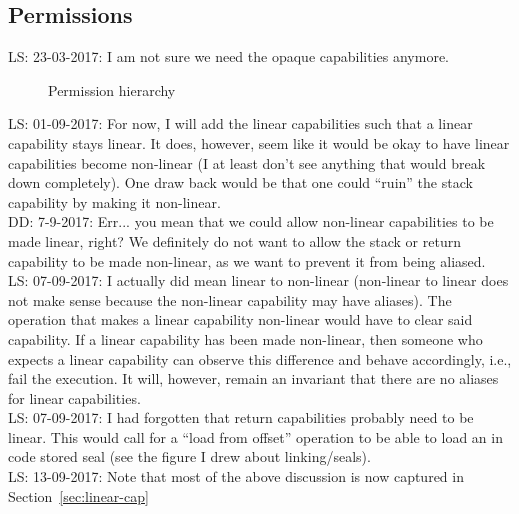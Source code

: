 \documentclass[a4paper]{article}
\newcommand\lau[1]{{\color{purple} \sf \footnotesize {LS: #1}}\\}
\newcommand\dominique[1]{{\color{purple} \sf \footnotesize {DD: #1}}\\}
\newcommand{\plainperm}[1]{\mathrm{#1}}
\newcommand{\rwx}{\plainperm{rwx}}
\newcommand{\rx}{\plainperm{rx}}
\newcommand{\rw}{\plainperm{rw}}
\newcommand{\readonly}{\plainperm{r}}
\newcommand{\noperm}{\plainperm{0}}
\newcommand{\enter}{\plainperm{e}}
\begin{document}
\subsection{Permissions}
\lau{23-03-2017: I am not sure we need the opaque capabilities anymore.} %
\begin{figure}[!h]
  \centering

  \caption{Permission hierarchy}
  \label{fig:perm-hier}
\end{figure}
\lau{01-09-2017: For now, I will add the linear capabilities such that a linear capability stays linear. It does, however, seem like it would be okay to have linear capabilities become non-linear (I at least don't see anything that would break down completely). One draw back would be that one could ``ruin'' the stack capability by making it non-linear.}
\dominique{7-9-2017: Err... you mean that we could allow non-linear capabilities to be made linear, right?  We definitely do not want to allow the stack or return capability to be made non-linear, as we want to prevent it from being aliased.}
\lau{07-09-2017: I actually did mean linear to non-linear (non-linear to linear does not make sense because the non-linear capability may have aliases). The operation that makes a linear capability non-linear would have to clear said capability. If a linear capability has been made non-linear, then someone who expects a linear capability can observe this difference and behave accordingly, i.e., fail the execution. It will, however, remain an invariant that there are no aliases for linear capabilities.}
\lau{07-09-2017: I had forgotten that return capabilities probably need to be linear. This would call for a ``load from offset'' operation to be able to load an in code stored seal (see the figure I drew about linking/seals).}
\lau{13-09-2017: Note that most of the above discussion is now captured in Section~\ref{sec:linear-cap}}
\end{document}
